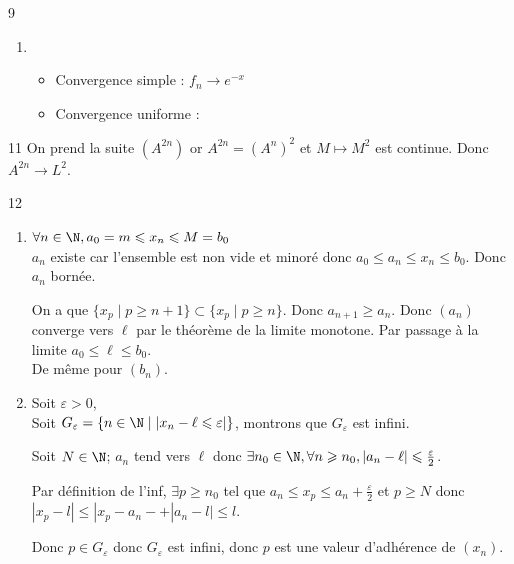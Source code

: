 \begin{correction}{9}
\begin{enumerate}
    \item~
    \begin{itemize}
        \item Convergence simple : $f_n \rightarrow e^{-x}$
        \item Convergence uniforme : 
    \end{itemize}
\end{enumerate}    
\end{correction}

\begin{correction}{11}
On prend la suite $(A^{2n})$ or $A^{2n} = (A^n)^2$ et $M \mapsto M^2$ est continue. Donc $A^{2n} \rightarrow L^2$.
\end{correction}

\begin{correction}{12}
\begin{enumerate}
    \item $\forall n \in \N, a_0 = m \leqslant x_n \leqslant M = b_0$\\
    
    $a_n$ existe car l'ensemble est non vide et minoré donc $a_0 \leqslant a_n \leqslant x_n \leqslant b_0$. Donc $a_n$ bornée.

    On a que $\{x_p \mid p \geqslant n + 1\} \subset \{x_p \mid p \geqslant n\}$. Donc $a_{n+1} \geqslant a_n$. Donc $(a_n)$ converge vers $\ell$ par le théorème de la limite monotone. Par passage à la limite $a_0 \leqslant \ell \leqslant b_0$.\\

    De même pour $(b_n)$.
    \item Soit $\varepsilon > 0$,\\

    Soit $G_{\varepsilon} = \{n \in \N \mid |x_n - \ell \leqslant \varepsilon|\}$, montrons que $G_{\varepsilon}$ est infini.

    Soit $N \in \N$;
    $a_n$ tend vers $\ell$ donc $\exists n_0 \in \N, \forall n \geqslant n_0, |a_n - \ell| \leqslant \frac{\varepsilon}2$.

    Par définition de l'inf, $\exists p \geqslant n_0$ tel que $a_n \leqslant x_p \leqslant a_n + \frac\varepsilon2$ et $p \geqslant N$ donc $|x_p - l| \leqslant |x_p - a_n- + |a_n -l| \leqslant l$.

    Donc $p \in G_{\varepsilon}$ donc $G_{\varepsilon}$ est infini, donc $p$ est une valeur d'adhérence de $(x_n)$.
\end{enumerate}
\end{correction}

